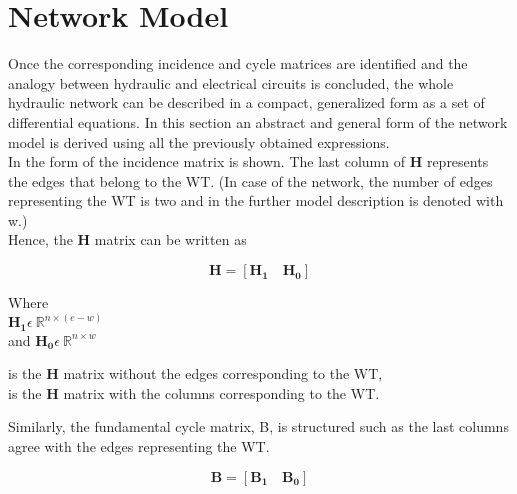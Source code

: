 \section{Network Model}  
\label{ParameterEstimation}
Once the corresponding incidence and cycle matrices are identified and the analogy between hydraulic and electrical circuits is concluded, the whole hydraulic network can be described in a compact, generalized form as a set of differential equations. In this section an abstract and general form of the network model is derived using all the previously obtained expressions. 
\\
In  the form of the incidence matrix is shown. The last column of $\pmb{H}$ represents the edges that belong to the WT. (In case of the network, the number of edges representing the WT is two and in the further model description is denoted with w.) 
\\
Hence, the $\pmb{H}$ matrix can be written as 

\begin {equation}
\pmb{H} = [\pmb{H_1} \quad \pmb{H_0}]
\label{Hmatrix}
\end{equation}

\begin{minipage}[t]{0.18\textwidth}
Where\\
\hspace*{8mm} $\pmb{H_1} \epsilon \: \mathbb{R}^{n \times (e-w)}$  \\
and \hspace*{0.4mm} $\pmb{H_0} \epsilon \: \mathbb{R}^{n \times w} $ 
\end{minipage}
\begin{minipage}[t]{0.70\textwidth}
\vspace*{2mm}
\hspace*{4mm} is the $\pmb{H}$ matrix without the edges corresponding to the WT,\\
\hspace*{4mm} is the $\pmb{H}$ matrix with the columns corresponding to the WT. 
\end{minipage}

Similarly, the fundamental cycle matrix, B, is structured such as the last columns agree with the edges representing the WT.

\begin{equation}
  \pmb{B} = [\pmb{B_1} \quad \pmb{B_0}]
\end{equation} 

